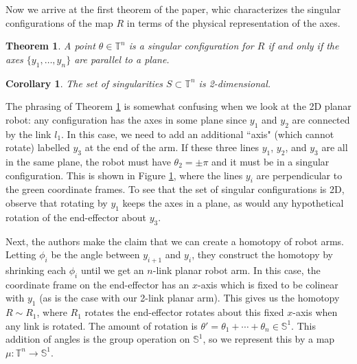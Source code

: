 \documentclass[12pt]{article}
\newtheorem{thm}{Theorem}
\newtheorem*{cor}{Corollary}
\theoremstyle{definition}
\begin{document}
Now we arrive at the first theorem of the paper, whic characterizes the singular
configurations of the map \(R\) in terms of the physical representation of the
axes.

\begin{thm}\label{thm:singular-plane}
    A point \(\theta \in \mathbb{T}^n\) is a singular configuration for \(R\) if
    and only if the axes \(\{y_1,\ldots,y_n\}\) are parallel to a plane.
\end{thm}
\begin{cor}
    The set of singularities \(S \subset \mathbb{T}^n\) is 2-dimensional.
\end{cor}

The phrasing of Theorem \ref{thm:singular-plane} is somewhat confusing when we
look at the 2D planar robot: any configuration has the axes in some plane since \(y_1\) and
\(y_2\) are connected by the link \(l_1\). 
In this case, we need to add an additional ``axis" (which cannot rotate) labelled
\(y_3\) at the end of the arm. If these three lines \(y_1\), \(y_2\), and \(y_3\)
are all in the same plane, the robot must have \(\theta_2 = \pm \pi\) and it
must be in a singular configuration. This is shown in Figure
\ref{fig:planar-singular-frames}, where the lines \(y_i\) are perpendicular to the
green coordinate frames.
To see that the set of singular configurations is 2D, observe that rotating by
\(y_1\) keeps the axes in a plane, as would any hypothetical rotation of the
end-effector about \(y_3\).

\begin{figure}

    \caption{}\label{fig:planar-singular-frames}
\end{figure}

Next, the authors make the claim that we can create a homotopy of robot arms.
Letting \(\phi_i\) be the angle between \(y_{i+1}\) and \(y_i\), they construct
the homotopy by shrinking each \(\phi_i\) until we get an \(n\)-link planar
robot arm. In this case, the coordinate frame on the end-effector has an 
\(x\)-axis which is fixed to be colinear with \(y_1\) (as is the case with our
2-link planar arm). This gives us the homotopy \(R \sim R_1\), where \(R_1\)
rotates the end-effector rotates about this fixed \(x\)-axis when any link
is rotated. The amount of rotation is 
\(\theta' = \theta_1 + \cdots + \theta_n \in \mathbb{S}^1\). This addition of
angles is the group operation on \(\mathbb{S}^1\), so we represent this by a map
\(\mu : \mathbb{T}^n \rightarrow \mathbb{S}^1\). 
\end{document}
